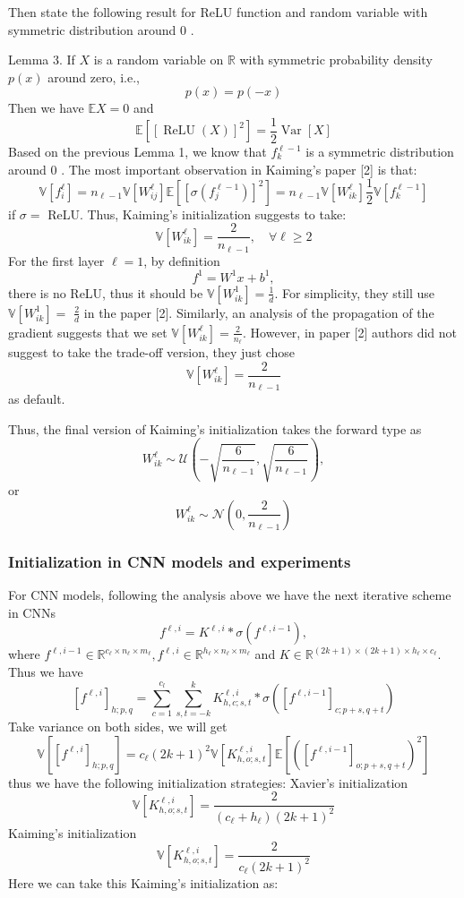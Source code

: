 \documentclass[10pt]{article}
\begin{document}
Then state the following result for ReLU function and random variable with symmetric distribution around 0 .

Lemma 3. If $X$ is a random variable on $\mathbb{R}$ with symmetric probability density $p(x)$ around zero, i.e.,
$$
p(x)=p(-x)
$$
Then we have $\mathbb{E} X=0$ and
$$
\mathbb{E}\left[[\operatorname{ReLU}(X)]^{2}\right]=\frac{1}{2} \operatorname{Var}[X]
$$
Based on the previous Lemma 1, we know that $f_{k}^{\ell-1}$ is a symmetric distribution around 0 . The most important observation in Kaiming's paper [2] is that:
$$
\mathbb{V}\left[f_{i}^{\ell}\right]=n_{\ell-1} \mathbb{V}\left[W_{i j}^{\ell}\right] \mathbb{E}\left[\left[\sigma\left(f_{j}^{\ell-1}\right)\right]^{2}\right]=n_{\ell-1} \mathbb{V}\left[W_{i k}^{\ell}\right] \frac{1}{2} \mathbb{V}\left[f_{k}^{\ell-1}\right]
$$
if $\sigma=$ ReLU. Thus, Kaiming's initialization suggests to take:
$$
\mathbb{V}\left[W_{i k}^{\ell}\right]=\frac{2}{n_{\ell-1}}, \quad \forall \ell \geq 2
$$
For the first layer $\ell=1$, by definition
$$
f^{1}=W^{1} x+b^{1},
$$
there is no ReLU, thus it should be $\mathbb{V}\left[W_{i k}^{1}\right]=\frac{1}{d} .$ For simplicity, they still use $\mathbb{V}\left[W_{i k}^{1}\right]=$ $\frac{2}{d}$ in the paper [2]. Similarly, an analysis of the propagation of the gradient suggests that we set $\mathbb{V}\left[W_{i k}^{\ell}\right]=\frac{2}{n_{\ell}}$. However, in paper [2] authors did not suggest to take the trade-off version, they just chose
$$
\mathbb{V}\left[W_{i k}^{\ell}\right]=\frac{2}{n_{\ell-1}}
$$
as default.

Thus, the final version of Kaiming's initialization takes the forward type as
$$
W_{i k}^{\ell} \sim \mathcal{U}\left(-\sqrt{\frac{6}{n_{\ell-1}}}, \sqrt{\frac{6}{n_{\ell-1}}}\right),
$$
or
$$
W_{i k}^{\ell} \sim \mathcal{N}\left(0, \frac{2}{n_{\ell-1}}\right)
$$

\subsubsection{Initialization in CNN models and experiments}
For CNN models, following the analysis above we have the next iterative scheme in CNNs
$$
f^{\ell, i}=K^{\ell, i} * \sigma\left(f^{\ell, i-1}\right),
$$
where $f^{\ell, i-1} \in \mathbb{R}^{c_{\ell} \times n_{\ell} \times m_{\ell}}, f^{\ell, i} \in \mathbb{R}^{h_{\ell} \times n_{\ell} \times m_{\ell}}$ and $K \in \mathbb{R}^{(2 k+1) \times(2 k+1) \times h_{\ell} \times c_{\ell}}$. Thus we have
$$
\left[f^{\ell, i}\right]_{h ; p, q}=\sum_{c=1}^{c_{l}} \sum_{s, t=-k}^{k} K_{h, c ; s, t}^{\ell, i} * \sigma\left(\left[f^{\ell, i-1}\right]_{c ; p+s, q+t}\right)
$$
Take variance on both sides, we will get
$$
\mathbb{V}\left[\left[f^{\ell, i}\right]_{h ; p, q}\right]=c_{\ell}(2 k+1)^{2} \mathbb{V}\left[K_{h, o ; s, t}^{\ell, i}\right] \mathbb{E}\left[\left(\left[f^{\ell, i-1}\right]_{o ; p+s, q+t}\right)^{2}\right]
$$
thus we have the following initialization strategies: Xavier's initialization
$$
\mathbb{V}\left[K_{h, o ; s, t}^{\ell, i}\right]=\frac{2}{\left(c_{\ell}+h_{\ell}\right)(2 k+1)^{2}}
$$
Kaiming's initialization
$$
\mathbb{V}\left[K_{h, o ; s, t}^{\ell, i}\right]=\frac{2}{c_{\ell}(2 k+1)^{2}}
$$
Here we can take this Kaiming's initialization as:
\end{document}
